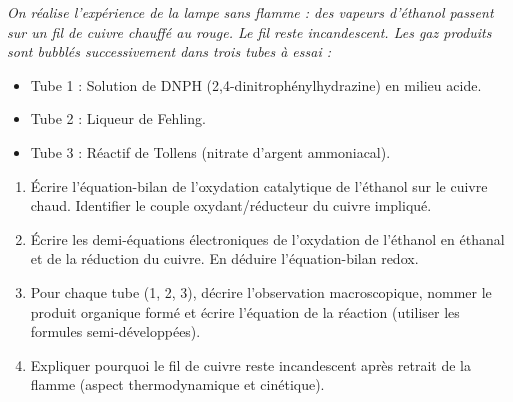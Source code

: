\documentclass[11pt]{article}
\begin{document}
\begin{exercice}
\emph{On réalise l'expérience de la lampe sans flamme : des vapeurs d'éthanol passent sur un fil de cuivre chauffé au rouge. Le fil reste incandescent. Les gaz produits sont bubblés successivement dans trois tubes à essai :}
\begin{itemize}
    \item Tube 1 : Solution de DNPH (2,4-dinitrophénylhydrazine) en milieu acide.
    \item Tube 2 : Liqueur de Fehling.
    \item Tube 3 : Réactif de Tollens (nitrate d'argent ammoniacal).
\end{itemize}
\begin{enumerate}
    \item Écrire l'équation-bilan de l'oxydation catalytique de l'éthanol sur le cuivre chaud. Identifier le couple oxydant/réducteur du cuivre impliqué.
    \item Écrire les demi-équations électroniques de l'oxydation de l'éthanol en éthanal et de la réduction du cuivre. En déduire l'équation-bilan redox.
    \item Pour chaque tube (1, 2, 3), décrire l'observation macroscopique, nommer le produit organique formé et écrire l'équation de la réaction (utiliser les formules semi-développées).
    \item Expliquer pourquoi le fil de cuivre reste incandescent après retrait de la flamme (aspect thermodynamique et cinétique).
\end{enumerate}
\end{exercice}
\end{document}
